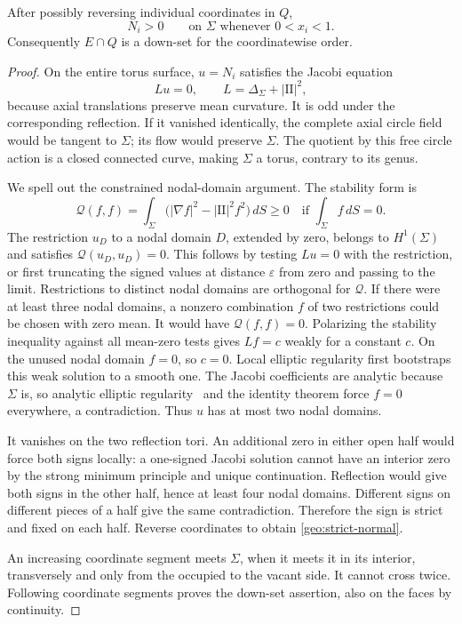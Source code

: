 \begin{lemma}\label{geo:normals}
After possibly reversing individual coordinates in \(Q\),
\begin{equation}
 N_i>0\qquad\text{on }\Sigma\text{ whenever }0<x_i<1.
 \label{geo:strict-normal}
\end{equation}
Consequently \(E\cap Q\) is a down-set for the coordinatewise order.
\end{lemma}

\begin{proof}
On the entire torus surface, \(u=N_i\) satisfies the Jacobi equation
\[
 Lu=0,\qquad L=\Delta_\Sigma+|\mathrm{II}|^2,
\]
because axial translations preserve mean curvature. It is odd under
the corresponding reflection. If it vanished identically, the complete
axial circle field would be tangent to \(\Sigma\); its flow would preserve
\(\Sigma\). The quotient by this free circle action is a closed connected
curve, making \(\Sigma\) a torus, contrary to its genus.

We spell out the constrained nodal-domain argument. The stability form is
\[
 \mathcal Q(f,f)=\int_\Sigma
       \bigl(|\nabla f|^2-|\mathrm{II}|^2f^2\bigr)\,dS\ge0
       \quad\text{if }\int_\Sigma f\,dS=0.
\]
The restriction \(u_D\) to a nodal domain \(D\), extended by zero,
belongs to \(H^1(\Sigma)\) and satisfies
\(\mathcal Q(u_D,u_D)=0\). This follows by testing \(Lu=0\) with
the restriction, or first truncating the signed values at distance
\(\varepsilon\) from zero and passing to the limit.
Restrictions to distinct nodal domains are orthogonal for \(\mathcal Q\).
If there were at least three nodal domains, a nonzero combination \(f\)
of two restrictions could be chosen with zero mean. It would have
\(\mathcal Q(f,f)=0\). Polarizing the stability inequality against all
mean-zero tests gives \(Lf=c\) weakly for a constant \(c\).
On the unused nodal domain \(f=0\), so \(c=0\).
Local elliptic regularity first bootstraps this weak solution to a
smooth one. The Jacobi coefficients are analytic because \(\Sigma\) is,
so analytic elliptic regularity~\cite[Theorem~1.1]{Blatt} and the
identity theorem force \(f=0\) everywhere,
a contradiction. Thus \(u\) has at most two nodal domains.

It vanishes on the two reflection tori. An additional zero in either
open half would force both signs locally: a one-signed Jacobi solution
cannot have an interior zero by the strong minimum principle and unique
continuation. Reflection would give both signs in the other half,
hence at least four nodal domains. Different signs on different pieces
of a half give the same contradiction. Therefore the sign is strict
and fixed on each half. Reverse coordinates to obtain
\eqref{geo:strict-normal}.

An increasing coordinate segment meets \(\Sigma\), when it meets it
in its interior, transversely and only from the occupied to the vacant
side. It cannot cross twice. Following coordinate segments proves the
down-set assertion, also on the faces by continuity.
\end{proof}

